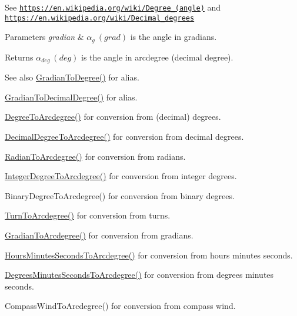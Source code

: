 See \href{https://en.wikipedia.org/wiki/Degree_(angle)}{\tt https\+://en.\+wikipedia.\+org/wiki/\+Degree\+\_\+(angle)} and \href{https://en.wikipedia.org/wiki/Decimal_degrees}{\tt https\+://en.\+wikipedia.\+org/wiki/\+Decimal\+\_\+degrees} 
\begin{DoxyParams}{Parameters}
{\em gradian} & $\alpha_{g}\ (grad)$ is the angle in gradians. \\
\hline
\end{DoxyParams}
\begin{DoxyReturn}{Returns}
$\alpha_{deg}\ (deg)$ is the angle in arcdegree (decimal degree). 
\end{DoxyReturn}
\begin{DoxySeeAlso}{See also}
\mbox{\hyperlink{group___e_g_x_math-_angle_conversions-_gradian_gaa284952274f16d225951cf5139d0ff4e}{Gradian\+To\+Degree()}} for alias. 

\mbox{\hyperlink{group___e_g_x_math-_angle_conversions-_gradian_ga346f47c519d5261b689cec49f4a8e789}{Gradian\+To\+Decimal\+Degree()}} for alias. 

\mbox{\hyperlink{group___e_g_x_math-_angle_conversions-_degree_gac1b5f3b68f66c77a6df4ceef842c9b19}{Degree\+To\+Arcdegree()}} for conversion from (decimal) degrees. 

\mbox{\hyperlink{group___e_g_x_math-_angle_conversions-_decimal_degree_gacdd463fcabffeb598ebda65b012ce743}{Decimal\+Degree\+To\+Arcdegree()}} for conversion from decimal degrees. 

\mbox{\hyperlink{group___e_g_x_math-_angle_conversions-_radian_ga3dfdc97357cc07f8379976bbc08f9852}{Radian\+To\+Arcdegree()}} for conversion from radians. 

\mbox{\hyperlink{group___e_g_x_math-_angle_conversions-_integer_degree_gaf633d0b82bfb7586ce86ffbcf78d8f7a}{Integer\+Degree\+To\+Arcdegree()}} for conversion from integer degrees. 

Binary\+Degree\+To\+Arcdegree() for conversion from binary degrees. 

\mbox{\hyperlink{group___e_g_x_math-_angle_conversions-_turn_ga7bdc3a81ce316dd47b1a3179489fa195}{Turn\+To\+Arcdegree()}} for conversion from turns. 

\mbox{\hyperlink{group___e_g_x_math-_angle_conversions-_gradian_gacd0b1797f2460944dcbc541a855ec21c}{Gradian\+To\+Arcdegree()}} for conversion from gradians. 

\mbox{\hyperlink{group___e_g_x_math-_angle_conversions-_hours_minutes_seconds_ga3c38143df47da88534ddbd13726748e2}{Hours\+Minutes\+Seconds\+To\+Arcdegree()}} for conversion from hours minutes seconds. 

\mbox{\hyperlink{group___e_g_x_math-_angle_conversions-_degrees_minutes_seconds_ga71fd0a3b9238a3a4fde150802938dee8}{Degrees\+Minutes\+Seconds\+To\+Arcdegree()}} for conversion from degrees minutes seconds. 

Compass\+Wind\+To\+Arcdegree() for conversion from compass wind. 
\end{DoxySeeAlso}
